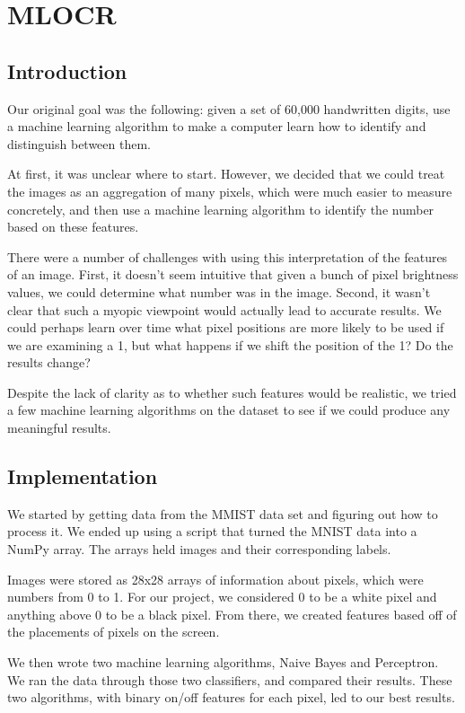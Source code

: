 \documentclass{article}
\theoremstyle{remark}
\begin{document}
	 \section*{MLOCR}
	\label*{Optical Character Recognition using Machine Learning}
	   \subsection*{Introduction}
     Our original goal was the following: given a set of 60,000 handwritten digits, use a machine learning algorithm to make a computer learn how to identify and distinguish between them.

     At first, it was unclear where to start. However, we decided that we could treat the images as an aggregation of many pixels, which were much easier to measure concretely, and then use a machine learning algorithm to identify the number based on these features.

     There were a number of challenges with using this interpretation of the features of an image. First, it doesn't seem intuitive that given a bunch of pixel brightness values, we could determine what number was in the image. Second, it wasn't clear that such a myopic viewpoint would actually lead to accurate results. We could perhaps learn over time what pixel positions are more likely to be used if we are examining a 1, but what happens if we shift the position of the 1? Do the results change?

     Despite the lack of clarity as to whether such features would be realistic, we tried a few machine learning algorithms on the dataset to see if we could produce any meaningful results.
     \subsection*{Implementation}
	We started by getting data from the MMIST data set and figuring out how to process it. We ended up using a script that turned the MNIST data into a NumPy array. The arrays held images and their corresponding labels.
	
	Images were stored as 28x28 arrays of information about pixels, which were numbers from 0 to 1. For our project, we considered 0 to be a white pixel and anything above 0 to be a black pixel. From there, we created features based off of the placements of pixels on the screen.
	
	We then wrote two machine learning algorithms, Naive Bayes and Perceptron. We ran the data through those two classifiers, and compared their results. These two algorithms, with binary on/off features for each pixel, led to our best results.
	
\end{document}
